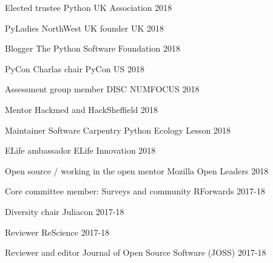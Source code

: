 


\begin{cvpress}

\cvpres
{Elected trustee} %
{Python UK Association}
{2018}

\cvpres
{PyLadies NorthWest UK founder} %
{UK}
{2018}

\cvpres
{Blogger} %
{The Python Software Foundation}
{2018}

\cvpres
{PyCon Charlas chair} %
{PyCon US}
{2018}


\cvpres
{Assessment group member}
{DISC NUMFOCUS}
{2018}

\cvpres
{Mentor}
{Hackmed and HackSheffield}
{2018}

\cvpres
{Maintainer} %
{Software Carpentry Python Ecology Lesson}
{2018}

\cvpres
{ELife ambassador}
{ELife Innovation}
{2018}

\cvpres
{Open source / working in the open mentor} %
{Mozilla Open Leaders} %
{2018} %

\cvpres
{Core committee member: Surveys and community} %
{RForwards}
{2017-18} %

\cvpres
{Diversity chair} %
{Juliacon} %
{2017-18} %

\cvpres
{Reviewer} %
{ReScience} %
{2017-18} %


\cvpres
{Reviewer and editor} %
{Journal of Open Source Software (JOSS)} %
{2017-18} %




\end{cvpress}
